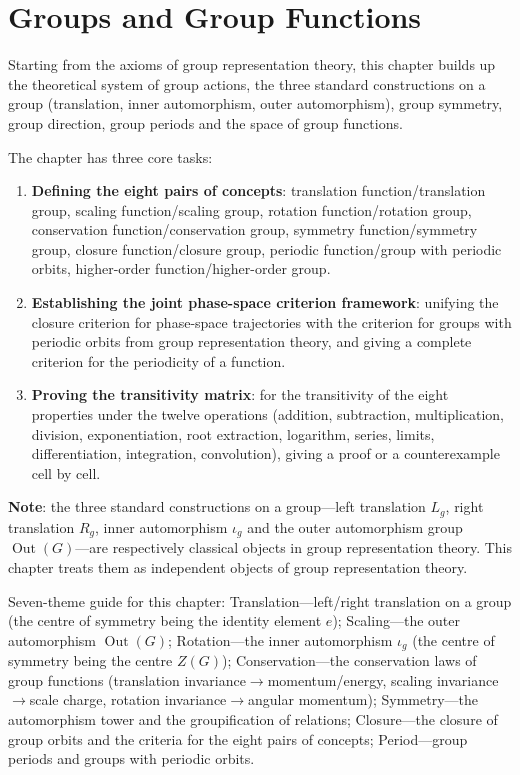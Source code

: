 \chapter{Groups and Group Functions}
\label{chap:group_function}

\begin{remark}\label{rem:group_function_chapter_positioning}
Starting from the axioms of group representation theory, this chapter builds up the theoretical system of group actions, the three standard constructions on a group (translation, inner automorphism, outer automorphism), group symmetry, group direction, group periods and the space of group functions.

The chapter has three core tasks:
\begin{enumerate}[label=(\arabic*)]
    \item \textbf{Defining the eight pairs of concepts}: translation function/translation group, scaling function/scaling group, rotation function/rotation group, conservation function/conservation group, symmetry function/symmetry group, closure function/closure group, periodic function/group with periodic orbits, higher-order function/higher-order group.
    \item \textbf{Establishing the joint phase-space criterion framework}: unifying the closure criterion for phase-space trajectories with the criterion for groups with periodic orbits from group representation theory, and giving a complete criterion for the periodicity of a function.
    \item \textbf{Proving the transitivity matrix}: for the transitivity of the eight properties under the twelve operations (addition, subtraction, multiplication, division, exponentiation, root extraction, logarithm, series, limits, differentiation, integration, convolution), giving a proof or a counterexample cell by cell.
\end{enumerate}

\textbf{Note}: the three standard constructions on a group---left translation $L_g$, right translation $R_g$, inner automorphism $\iota_g$ and the outer automorphism group $\operatorname{Out}(G)$---are respectively classical objects in group representation theory. This chapter treats them as independent objects of group representation theory.

Seven-theme guide for this chapter: Translation---left/right translation on a group (the centre of symmetry being the identity element $e$); Scaling---the outer automorphism $\operatorname{Out}(G)$; Rotation---the inner automorphism $\iota_g$ (the centre of symmetry being the centre $Z(G)$); Conservation---the conservation laws of group functions (translation invariance$\to$momentum/energy, scaling invariance$\to$scale charge, rotation invariance$\to$angular momentum); Symmetry---the automorphism tower and the groupification of relations; Closure---the closure of group orbits and the criteria for the eight pairs of concepts; Period---group periods and groups with periodic orbits.
\end{remark}

